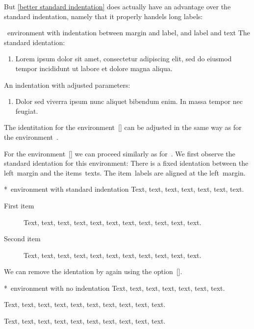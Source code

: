 But \cref{better standard indentation} does actually have an advantage over the standard indentation, namely that it properly handels long labels:
\begin{showlatex}{~environment with indentation between margin and label, and label and text}
The standard identation:
\begin{enumerate}[label = {(Latin \arabic*)}]
  \item
  Lorem ipsum dolor sit amet, consectetur adipiscing elit, sed do eiusmod tempor incididunt ut labore et dolore magna aliqua.
\end{enumerate}
An indentation with adjusted parameters:
\begin{enumerate}[label = {(Latin \arabic*)}, wide = 0pt, leftmargin = *, labelindent = \parindent]
  \item
  Dolor sed viverra ipsum nunc aliquet bibendum enim.
  In massa tempor nec feugiat.
\end{enumerate}
\end{showlatex}

The identitation for the environment~[\envname] can be adjusted in the same way as for the environment~.

For the environment~[\envname] we can proceed similarly as for~.
We first observe the standard identation for this environment:
There is a fixed identation between the left~margin and the items~texts.
The item~labels are aligned at the left~margin.
\begin{showlatex}*{~environment with standard indentation}
Text, text, text, text, text, text, text.
\begin{description}
  \item[First item]
    Text, text, text, text, text, text, text, text, text, text, text.
  \item[Second item]
     Text, text, text, text, text, text, text, text, text, text, text.
\end{description}
\end{showlatex}
We can remove the identation by again using the option~[\optname].
\begin{showlatex}*{~environment with no indentation}
Text, text, text, text, text, text, text.
\begin{description}[wide = 0pt]
  \item[First item]
    Text, text, text, text, text, text, text, text, text, text.
  \item[Second item]
     Text, text, text, text, text, text, text, text, text, text.
\end{description}
\end{showlatex}

